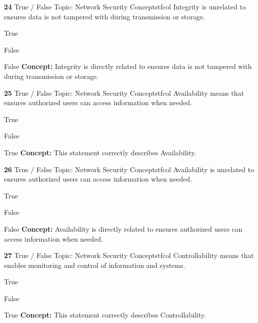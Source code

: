 \documentclass[10pt,a4paper]{article}
\begin{document}
\begin{qcard}{\color{white}\textbf{24} \hfill \small True / False \textbar{} Topic: Network Security Concepts}{tfcol}
Integrity is unrelated to ensures data is not tampered with during transmission or storage.

\begin{qoptions}
\item True
\item False
\end{qoptions}
\begin{explainbox}{False}
\textbf{Concept:} Integrity is directly related to ensures data is not tampered with during transmission or storage.
\end{explainbox}
\end{qcard}

\begin{qcard}{\color{white}\textbf{25} \hfill \small True / False \textbar{} Topic: Network Security Concepts}{tfcol}
Availability means that ensures authorized users can access information when needed.

\begin{qoptions}
\item True
\item False
\end{qoptions}
\begin{explainbox}{True}
\textbf{Concept:} This statement correctly describes Availability.
\end{explainbox}
\end{qcard}

\begin{qcard}{\color{white}\textbf{26} \hfill \small True / False \textbar{} Topic: Network Security Concepts}{tfcol}
Availability is unrelated to ensures authorized users can access information when needed.

\begin{qoptions}
\item True
\item False
\end{qoptions}
\begin{explainbox}{False}
\textbf{Concept:} Availability is directly related to ensures authorized users can access information when needed.
\end{explainbox}
\end{qcard}

\begin{qcard}{\color{white}\textbf{27} \hfill \small True / False \textbar{} Topic: Network Security Concepts}{tfcol}
Controllability means that enables monitoring and control of information and systems.

\begin{qoptions}
\item True
\item False
\end{qoptions}
\begin{explainbox}{True}
\textbf{Concept:} This statement correctly describes Controllability.
\end{explainbox}
\end{qcard}
\end{document}
